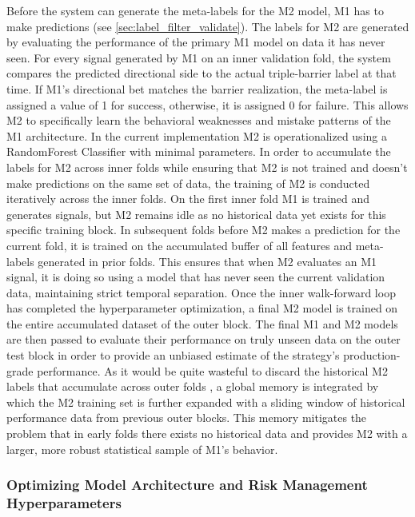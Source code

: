 \documentclass[12pt, a4paper]{article}
\begin{document}
Before the system can generate the meta-labels for the M2 model, M1 has to make predictions (see \ref{sec:label_filter_validate}). 
The labels for M2 are generated by evaluating the performance of the primary M1 model on data it has never seen. For every signal generated by M1 on an inner validation fold, 
the system compares the predicted directional side to the actual triple-barrier label at that time. If M1's directional bet matches the barrier realization, 
the meta-label is assigned a value of 1 for success, otherwise, it is assigned 0 for failure. This allows M2 to specifically learn the behavioral weaknesses and 
mistake patterns of the M1 architecture. In the current implementation M2 is operationalized using a RandomForest Classifier with minimal parameters.
In order to accumulate the labels for M2 across inner folds while ensuring that M2 is not trained and doesn't make predictions on the same set of data, the training of M2 is 
conducted iteratively across the inner folds. On the first inner fold M1 is trained and generates signals, but M2 remains idle as no historical data yet exists for this specific training block.
In subsequent folds before M2 makes a prediction for the current fold, it is trained on the accumulated buffer of all features and meta-labels generated in prior folds.
This ensures that when M2 evaluates an M1 signal, it is doing so using a model that has never seen the current validation data, maintaining strict temporal separation.
Once the inner walk-forward loop has completed the hyperparameter optimization, a final M2 model is trained on the entire accumulated dataset of the outer block. 
The final M1 and M2 models are then passed to evaluate their performance on truly unseen data on the outer test block in order to provide an unbiased estimate of the 
strategy's production-grade performance. As it would be quite wasteful to discard the historical M2 labels that accumulate across outer folds , a global memory is integrated by 
which the M2 training set is further expanded with a sliding window of historical performance data from previous outer blocks. 
This memory mitigates the problem that in early folds there exists no historical data and provides M2 with a larger, more robust statistical sample of M1's behavior.


\subsubsection{Optimizing Model Architecture and Risk Management Hyperparameters}\label{sec:optimize}
\end{document}
